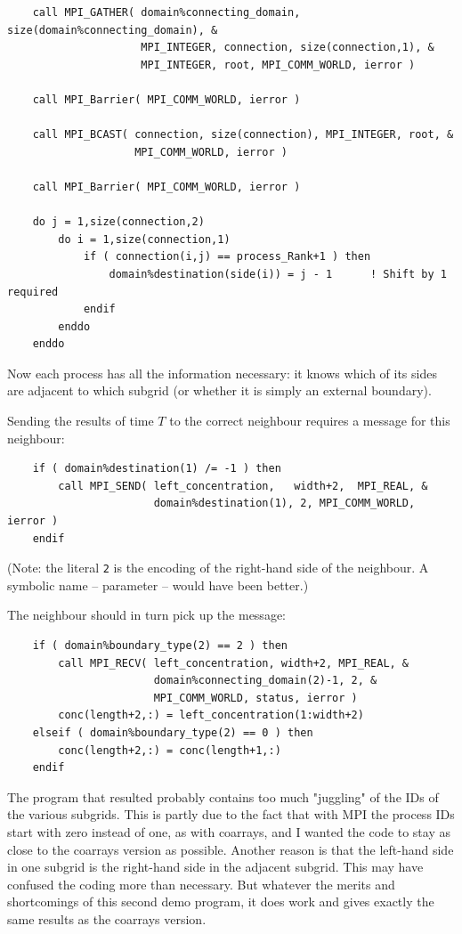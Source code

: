\documentclass[onecolumn]{article}
\begin{document}
\begin{lstlisting}
    call MPI_GATHER( domain%connecting_domain, size(domain%connecting_domain), &
                     MPI_INTEGER, connection, size(connection,1), &
                     MPI_INTEGER, root, MPI_COMM_WORLD, ierror )

    call MPI_Barrier( MPI_COMM_WORLD, ierror )

    call MPI_BCAST( connection, size(connection), MPI_INTEGER, root, &
                    MPI_COMM_WORLD, ierror )

    call MPI_Barrier( MPI_COMM_WORLD, ierror )

    do j = 1,size(connection,2)
        do i = 1,size(connection,1)
            if ( connection(i,j) == process_Rank+1 ) then
                domain%destination(side(i)) = j - 1      ! Shift by 1 required
            endif
        enddo
    enddo
\end{lstlisting}

Now each process has all the information necessary: it knows which of its sides are adjacent to which
subgrid (or whether it is simply an external boundary).

Sending the results of time $T$ to the correct neighbour requires a message for this neighbour:

\begin{lstlisting}
    if ( domain%destination(1) /= -1 ) then
        call MPI_SEND( left_concentration,   width+2,  MPI_REAL, &
                       domain%destination(1), 2, MPI_COMM_WORLD, ierror )
    endif
\end{lstlisting}

(Note: the literal \verb+2+ is the encoding of the right-hand side of the neighbour. A symbolic name -- parameter -- would have been better.)

The neighbour should in turn pick up the message:

\begin{lstlisting}
    if ( domain%boundary_type(2) == 2 ) then
        call MPI_RECV( left_concentration, width+2, MPI_REAL, &
                       domain%connecting_domain(2)-1, 2, &
                       MPI_COMM_WORLD, status, ierror )
        conc(length+2,:) = left_concentration(1:width+2)
    elseif ( domain%boundary_type(2) == 0 ) then
        conc(length+2,:) = conc(length+1,:)
    endif
\end{lstlisting}

The program that resulted probably contains too much "juggling" of the IDs of the various subgrids. This is partly due to the fact that with MPI
the process IDs start with zero instead of one, as with coarrays, and I wanted the code to stay as close to the coarrays version as
possible. Another reason is that the left-hand side in one subgrid is the right-hand side in the adjacent subgrid. This may have confused
the coding more than necessary. But whatever the merits and shortcomings of this second demo program, it does work and gives exactly
the same results as the coarrays version.
\end{document}
